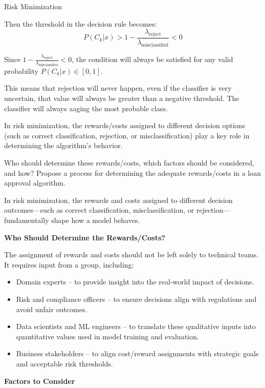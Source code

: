 \documentclass[
	english,
        solution=true
	]{tudaexercise}
\begin{document}
\begin{task}[points=11]{Risk Minimization}
\begin{subtask}[points=1]
\begin{solution}
Then the threshold in the decision rule becomes:
\[
P(C_k | x) > 1 - \frac{\lambda_\text{reject}}{\lambda_\text{misclassified}} < 0
\]

Since $1 - \frac{\lambda_\text{reject}}{\lambda_\text{misclassified}} < 0$, the condition will always be satisfied for any valid probability $P(C_k | x) \in [0, 1]$.

This means that rejection will never happen, even if the classifier is very uncertain, that value will always be greater than a negative threshold.
The classifier will always aaging the most probable class.

\end{solution}
\end{subtask}
\newpage
\begin{subtask}[points=5]
In risk minimization, the rewards/costs assigned to different decision options (such as correct classification, rejection, or misclassification) play a key role in determining the algorithm’s behavior.

Who should determine these rewards/costs, which factors should be considered, and how? Propose a process for determining the adequate rewards/costs in a loan approval algorithm.

\begin{solution}
In risk minimization, the rewards and costs assigned to different decision outcomes—such as correct classification, misclassification, or rejection—fundamentally shape how a model behaves.

\textbf{Who Should Determine the Rewards/Costs?}

The assignment of rewards and costs should not be left solely to technical teams. It requires input from a group, including:
\begin{itemize}
    \item Domain experts – to provide insight into the real-world impact of decisions.
    \item Risk and compliance officers – to ensure decisions align with regulations and avoid unfair outcomes.
    \item Data scientists and ML engineers – to translate these qualitative inputs into quantitative values used in model training and evaluation.
    \item Business stakeholders – to align cost/reward assignments with strategic goals and acceptable risk thresholds.
\end{itemize}

\textbf{Factors to Consider}


\end{solution}
\end{subtask}
\end{task}
\end{document}
